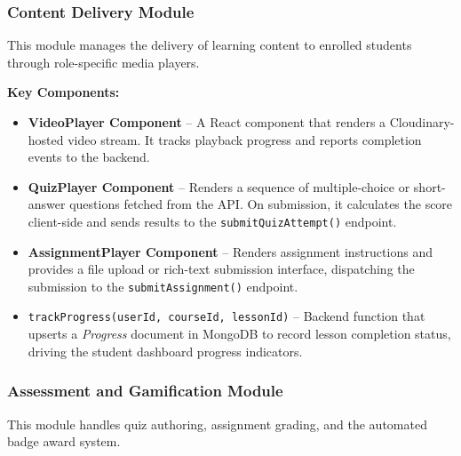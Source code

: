 \subsubsection{Content Delivery Module}

This module manages the delivery of learning content to enrolled students through role-specific media players.

\textbf{Key Components:}
\begin{itemize}
    \item \textbf{VideoPlayer Component} -- A React component that renders a Cloudinary-hosted video stream. It tracks playback progress and reports completion events to the backend.
    \item \textbf{QuizPlayer Component} -- Renders a sequence of multiple-choice or short-answer questions fetched from the API. On submission, it calculates the score client-side and sends results to the \texttt{submitQuizAttempt()} endpoint.
    \item \textbf{AssignmentPlayer Component} -- Renders assignment instructions and provides a file upload or rich-text submission interface, dispatching the submission to the \texttt{submitAssignment()} endpoint.
    \item \texttt{trackProgress(userId, courseId, lessonId)} -- Backend function that upserts a \textit{Progress} document in MongoDB to record lesson completion status, driving the student dashboard progress indicators.
\end{itemize}

\subsubsection{Assessment and Gamification Module}

This module handles quiz authoring, assignment grading, and the automated badge award system.

